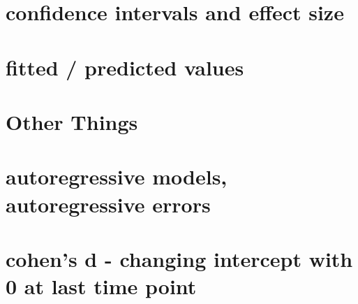 \section{confidence intervals and effect
size}\label{confidence-intervals-and-effect-size}

\section{fitted / predicted values}\label{fitted-predicted-values}

\section{Other Things}\label{other-things}

\section{autoregressive models, autoregressive
errors}\label{autoregressive-models-autoregressive-errors}

\section{cohen's d - changing intercept with 0 at last time
point}\label{cohens-d---changing-intercept-with-0-at-last-time-point}
